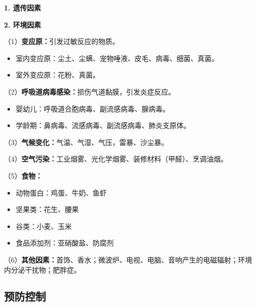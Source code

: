 \begin{keybox}
\textbf{1. 遗传因素}

\textbf{2. 环境因素}

（1）\textbf{变应原：}引发过敏反应的物质。
\begin{itemize}
    \item 室内变应原：尘土、尘螨、宠物唾液、皮毛、病毒、细菌、真菌。
    \item 室外变应原：花粉、真菌。
\end{itemize}

（2）\textbf{呼吸道病毒感染：}损伤气道黏膜，引发炎症反应。
\begin{itemize}
    \item 婴幼儿：呼吸道合胞病毒、副流感病毒、腺病毒。
    \item 学龄期：鼻病毒、流感病毒、副流感病毒、肺炎支原体。
\end{itemize}

（3）\textbf{气候变化：}气温、气湿、气压，雷暴、沙尘暴。

（4）\textbf{空气污染：}工业烟雾、光化学烟雾、装修材料（甲醛）、烹调油烟。

（5）\textbf{食物：}
\begin{itemize}
    \item 动物蛋白：鸡蛋、牛奶、鱼虾
    \item 坚果类：花生、腰果
    \item 谷类：小麦、玉米
    \item 食品添加剂：亚硝酸盐、防腐剂
\end{itemize}

（6）\textbf{其他因素：}首饰、香水；微波炉、电视、电脑、音响产生的电磁辐射；环境内分泌干扰物；肥胖症。
\end{keybox}

\subsection{预防控制}

